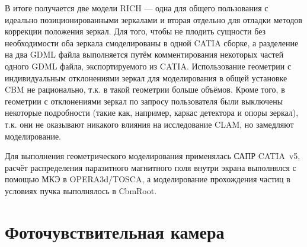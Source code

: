 В итоге получается две модели RICH --- одна для общего пользования с идеально позиционированными зеркалами и вторая отдельно для отладки методов коррекции положения зеркал. Для того, чтобы не \todo плодить сущности без необходимости оба зеркала смоделированы в одной CATIA сборке, а разделение на два GDML файла выполняется путём комментирования некоторых частей одного GDML файла, экспортируемого из CATIA. Использование геометрии с индивидуальным отклонениями зеркал для моделирования в общей установке CBM не рационально, т.к. в такой геометрии больше объёмов. Кроме того, в геометрии с отклонениями зеркал по запросу пользователя были выключены некоторые подробности (такие как, например, каркас детектора и опоры зеркал), т.к. они не оказывают никакого влияния на исследование CLAM, но замедляют моделирование.


Для выполнения геометрического моделирования применялась САПР CATIA~v5, расчёт распределения паразитного магнитного поля внутри экрана выполнялся с помощью МКЭ в OPERA3d/TOSCA, а моделирование прохождения частиц в условиях пучка выполнялось в CbmRoot.

%                                      

\section{Фоточувствительная камера}\label{sec:secRICHgeoCamera}

